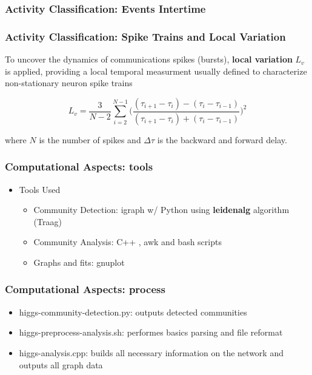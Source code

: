 \documentclass{beamer}
\begin{document}

\begin{frame}
\frametitle{Activity Classification: Events Intertime}

\end{frame}



\begin{frame}
\frametitle{Activity Classification: Spike Trains and Local Variation}
To uncover the dynamics of communications spikes (bursts), \textbf{local variation} $L_{v}$ is applied, providing a local temporal measurment usually defined to characterize non-stationary neuron spike trains \footnotemark 

$$L_{v}=\frac{3}{N-2}\sum_{i=2}^{N-1}\bigg(\frac{(\tau_{i+1}-\tau_{i}) - (\tau_{i}-\tau_{i-1})}{(\tau_{i+1}-\tau_{i}) + (\tau_{i}-\tau_{i-1})}\bigg)^2 $$

where $N$ is the number of spikes and $\Delta\tau$ is the backward and forward delay.

\end{frame}


\begin{frame}
\frametitle{Computational Aspects: tools}

\begin{itemize}
	\item Tools Used
	\begin{itemize}
		\item Community Detection: igraph w/ Python using \textbf{leidenalg} algorithm (Traag)
		\item Community Analysis: C++ , awk and bash scripts
		\item Graphs and fits: gnuplot
	\end{itemize}
\end{itemize}
\end{frame}


\begin{frame}
\frametitle{Computational Aspects: process}

\begin{itemize}
	\item higgs-community-detection.py: outputs detected communities
	\item higgs-preprocess-analysis.sh: performes basics parsing and file reformat
	\item higgs-analysis.cpp: builds all necessary information on the network and outputs all graph data
\end{itemize}
\end{frame}
\end{document}
